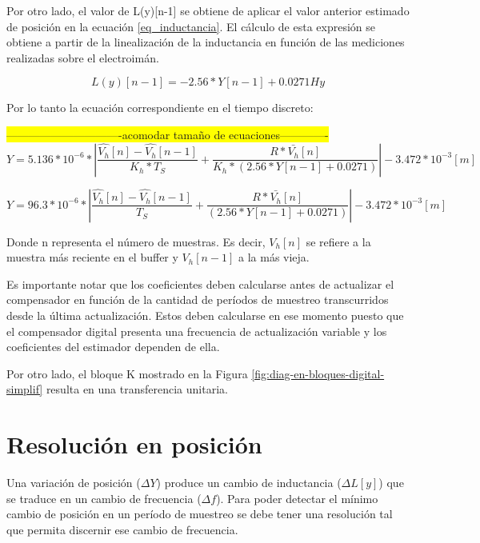 \noindent Por otro lado, el valor de L(y)[n-1] se obtiene de aplicar el valor anterior estimado de posición en la ecuación \ref{eq_inductancia}. El cálculo de esta expresión se obtiene a partir de la linealización de la inductancia en función de las mediciones realizadas sobre el electroimán.

\begin{equation} \label{eq_inductancia}
	L(y)[n-1] = -2.56*Y[n-1]+0.0271 Hy
\end{equation}

\noindent Por lo tanto la ecuación correspondiente en el tiempo discreto:

\colorbox{yellow}{-------------------------------acomodar tamaño de ecuaciones-------------}
\begin{equation}
	Y = 5.136*10^{-6}*|\frac{\hat{V_h}[n]-\hat{V_h}[n-1]}{K_h*T_S} + \frac{R*\bar{V_h}[n]}{K_h*(2.56*Y[n-1]+0.0271)}|-3.472*10^{-3}[m]
\end{equation}

\begin{equation}
	Y = 96.3*10^{-6}*|\frac{\hat{V_h}[n]-\hat{V_h}[n-1]}{T_S} + \frac{R*\bar{V_h}[n]}{(2.56*Y[n-1]+0.0271)}|-3.472*10^{-3}[m]
\end{equation}


\noindent Donde n representa el número de muestras. Es decir, $V_h[n]$ se refiere a la muestra más reciente en el buffer y $V_h[n-1]$ a la más vieja.

\noindent Es importante notar que los coeficientes deben calcularse antes de actualizar el compensador en función de la cantidad de períodos de muestreo transcurridos desde la última actualización. Estos deben calcularse en ese momento puesto que el compensador digital presenta una frecuencia de actualización variable y los coeficientes del estimador dependen de ella.

\noindent Por otro lado, el bloque K mostrado en la Figura \ref{fig:diag-en-bloques-digital-simplif} resulta en una transferencia unitaria.

\section{Resolución en posición}

\noindent Una variación de posición ($\Delta Y$) produce un cambio de inductancia ($\Delta L[y]$) que se traduce en un cambio de frecuencia ($\Delta f$). Para poder detectar el mínimo cambio de posición en un período de muestreo se debe tener una resolución tal que permita discernir ese cambio de frecuencia.

